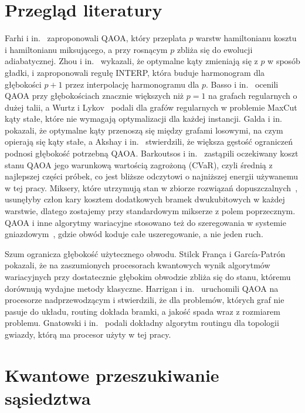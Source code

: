 \documentclass[runningheads]{llncs}
\begin{document}
\section{Przegląd literatury}

Farhi i in.~\cite{farhi2014qaoa} zaproponowali QAOA, który przeplata $p$
warstw hamiltonianu kosztu i hamiltonianu miksującego, a przy rosnącym $p$
zbliża się do ewolucji adiabatycznej. Zhou i in.~\cite{zhou2020} wykazali,
że optymalne kąty zmieniają się z $p$ w sposób gładki, i zaproponowali regułę
INTERP, która buduje harmonogram dla głębokości $p+1$ przez interpolację
harmonogramu dla $p$. Basso i in.~\cite{basso2022} ocenili QAOA przy
głębokościach znacznie większych niż $p = 1$ na grafach regularnych o dużej
talii, a Wurtz i Lykov~\cite{wurtz2021fixed} podali dla grafów regularnych
w problemie MaxCut kąty stałe, które nie wymagają optymalizacji dla każdej
instancji. Galda i in.~\cite{galda2021} pokazali, że optymalne kąty
przenoszą się między grafami losowymi, na czym opierają się kąty stałe,
a Akshay i in.~\cite{akshay2020} stwierdzili, że większa gęstość ograniczeń
podnosi głębokość potrzebną QAOA. Barkoutsos i in.~\cite{barkoutsos2020cvar}
zastąpili oczekiwany koszt stanu QAOA jego warunkową wartością zagrożoną
(CVaR), czyli średnią z najlepszej części próbek, co jest bliższe odczytowi
o najniższej energii używanemu w tej pracy. Miksery, które utrzymują stan
w zbiorze rozwiązań dopuszczalnych~\cite{hadfield2019}, usunęłyby człon kary
kosztem dodatkowych bramek dwukubitowych w każdej warstwie, dlatego
zostajemy przy standardowym mikserze z polem poprzecznym. QAOA i inne
algorytmy wariacyjne stosowano też do szeregowania w systemie
gniazdowym~\cite{kurowski2023,amaro2022}, gdzie obwód koduje całe
uszeregowanie, a nie jeden ruch.

Szum ogranicza głębokość użytecznego obwodu. Stilck Fran\c{c}a
i Garc\'{i}a-Patr\'{o}n~\cite{franca2021} pokazali, że na zaszumionych
procesorach kwantowych wynik algorytmów wariacyjnych przy dostatecznie głębokim obwodzie
zbliża się do stanu, któremu dorównują wydajne metody klasyczne. Harrigan
i in.~\cite{harrigan2021} uruchomili QAOA na procesorze nadprzewodzącym
i stwierdzili, że dla problemów, których graf nie pasuje do układu, routing
dokłada bramki, a jakość spada wraz z rozmiarem problemu. Gnatowski
i in.~\cite{gnatowski2026routing} podali dokładny algorytm routingu dla topologii gwiazdy, którą ma procesor użyty w tej pracy.

\section{Kwantowe przeszukiwanie sąsiedztwa}
\end{document}
